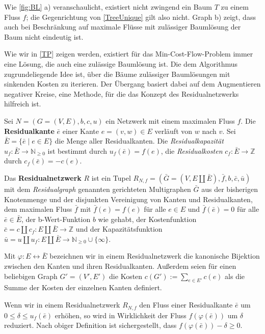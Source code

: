 Wie \cref{fig:BL} a) veranschaulicht, existiert nicht zwingend ein Baum $T$ zu einem Fluss $f$; die Gegenrichtung von \cref{TreeUnique} gilt also nicht. Graph b) zeigt, dass auch bei Beschränkung auf maximale Flüsse mit zulässiger Baumlösung der Baum nicht eindeutig ist.

Wie wir in \cref{TP} zeigen werden, existiert für das Min-Cost-Flow-Problem immer eine Lösung, die auch eine zulässige Baumlösung ist. Die dem Algorithmus zugrundeliegende Idee ist, über die Bäume zulässiger Baumlösungen mit sinkenden Kosten zu iterieren. Der Übergang basiert dabei auf dem Augmentieren negativer Kreise, eine Methode, für die das Konzept des Residualnetzwerks hilfreich ist.

\begin{defn}\label{defRes}Sei $N=(G=(V,E),b,c,u)$ ein Netzwerk mit einem maximalen Fluss $f$. Die \textbf{Residualkante} $\bar{e}$ einer Kante $e=(v,w)\in E$ verläuft von $w$ nach $v$. Sei $\bar{E}=\{\bar{e}\mid e\in E\}$ die Menge aller Residualkanten. Die \textit{Residualkapazität} $u_f\colon\bar{E}\rightarrow\mathbb{N}_{\geq0}$ ist bestimmt durch $u_f(\bar{e})=f(e)$, die \textit{Residualkosten} $c_f\colon\bar{E}\rightarrow\mathbb{Z}$ durch $c_f(\bar{e})=-c(e)$.

Das \textbf{Residualnetzwerk} $R$ ist ein Tupel $R_{N,f}=(\bar{G}=(V,E\amalg\bar{E}),\bar{f},b,\bar{c},\bar{u})$ mit dem \emph{Residualgraph} genannten gerichteten Multigraphen $\bar{G}$ aus der bisherigen Knotenmenge und der disjunkten Vereinigung von Kanten und Residualkanten, dem maximalen Fluss $\bar{f}$ mit $\bar{f}(e)=f(e)$ für alle $e\in E$ und $\bar{f}(\bar{e})=0$ für alle $\bar{e}\in\bar{E}$, der b-Wert-Funktion $b$ wie gehabt, der Kostenfunktion $\bar{c}=c\amalg c_f\colon E\amalg\bar{E}\rightarrow\mathbb{Z}$ und der Kapazitätsfunktion $\bar{u}=u\amalg u_f\colon E\amalg\bar{E}\rightarrow\mathbb{N}_{\geq0}\cup \{\infty\}$.\end{defn}

\begin{nota}Mit $\varphi\colon E\leftrightarrow\bar{E}$ bezeichnen wir in einem Residualnetzwerk die kanonische Bijektion zwischen den Kanten und ihren Residualkanten. Außerdem seien für einen beliebigen Graph $G'=(V',E')$ die Kosten $c(G'):=\sum_{e\in E'} c(e)$ als die Summe der Kosten der einzelnen Kanten definiert.\end{nota}

Wenn wir in einem Residualnetzwerk $R_{N,f}$ den Fluss einer Residualkante $\bar{e}$ um $0\leq\delta\leq u_f(\bar{e})$ erhöhen, so wird in Wirklichkeit der Fluss $f(\varphi(\bar{e}))$ um $\delta$ reduziert. Nach obiger Definition ist sichergestellt, dass $f(\varphi(\bar{e}))-\delta\geq0$.

